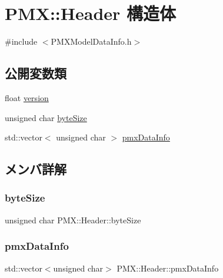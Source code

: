 \hypertarget{struct_p_m_x_1_1_header}{}\section{P\+MX\+:\+:Header 構造体}
\label{struct_p_m_x_1_1_header}


{\ttfamily \#include $<$P\+M\+X\+Model\+Data\+Info.\+h$>$}

\subsection*{公開変数類}
\begin{DoxyCompactItemize}
\item 
float \mbox{\hyperlink{struct_p_m_x_1_1_header_ab31b5e1992e6a57db7617286fdeec3b2}{version}}
\item 
unsigned char \mbox{\hyperlink{struct_p_m_x_1_1_header_a3e01d33f73c8ddc0f2d4b45b2105f15d}{byte\+Size}}
\item 
std\+::vector$<$ unsigned char $>$ \mbox{\hyperlink{struct_p_m_x_1_1_header_a337c28323ffdadc5d016c413527d19b3}{pmx\+Data\+Info}}
\end{DoxyCompactItemize}


\subsection{メンバ詳解}
\mbox{\label{struct_p_m_x_1_1_header_a3e01d33f73c8ddc0f2d4b45b2105f15d}} 
\subsubsection{\texorpdfstring{byte\+Size}{byteSize}}
{\footnotesize\ttfamily unsigned char P\+M\+X\+::\+Header\+::byte\+Size}

\mbox{\label{struct_p_m_x_1_1_header_a337c28323ffdadc5d016c413527d19b3}} 
\subsubsection{\texorpdfstring{pmx\+Data\+Info}{pmxDataInfo}}
{\footnotesize\ttfamily std\+::vector$<$unsigned char$>$ P\+M\+X\+::\+Header\+::pmx\+Data\+Info}

